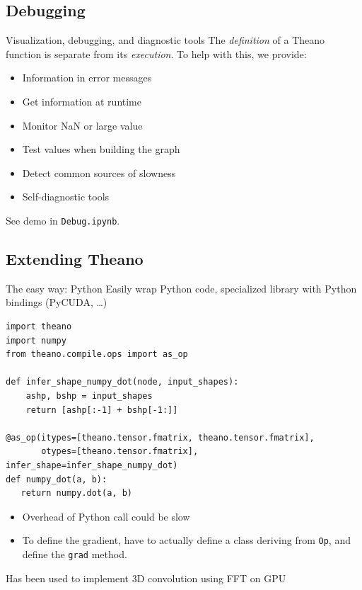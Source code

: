 \documentclass[a4paper,9pt]{beamer}
\begin{document}
\subsection{Debugging}
\begin{frame}[fragile]{Visualization, debugging, and diagnostic tools}
  The \emph{definition} of a Theano function is separate from its \emph{execution}.
  To help with this, we provide:
  \begin{itemize}
    \item Information in error messages
    \item Get information at runtime
    \item Monitor NaN or large value
    \item Test values when building the graph
    \item Detect common sources of slowness
    \item Self-diagnostic tools
  \end{itemize}
  See demo in \verb|Debug.ipynb|.
\end{frame}

\subsection{Extending Theano}

\begin{frame}[fragile]{The easy way: Python}
\small
  Easily wrap Python code, specialized library with Python bindings (PyCUDA, \ldots)

  \begin{verbatim}
import theano
import numpy
from theano.compile.ops import as_op

def infer_shape_numpy_dot(node, input_shapes):
    ashp, bshp = input_shapes
    return [ashp[:-1] + bshp[-1:]]

@as_op(itypes=[theano.tensor.fmatrix, theano.tensor.fmatrix],
       otypes=[theano.tensor.fmatrix], infer_shape=infer_shape_numpy_dot)
def numpy_dot(a, b):
   return numpy.dot(a, b)

  \end{verbatim}
  \begin{itemize}
    \item Overhead of Python call could be slow
    \item To define the gradient, have to actually define a class deriving from \verb|Op|,
      and define the \verb|grad| method.
  \end{itemize}
  Has been used to implement 3D convolution using FFT on GPU
\end{frame}
\end{document}
